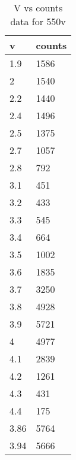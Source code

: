 \begin{table}[H]
    \centering
    \begin{tabular}{|l|l|}
    \hline
        v & counts \\ \hline
        1.9 & 1586 \\ \hline
        2 & 1540 \\ \hline
        2.2 & 1440 \\ \hline
        2.4 & 1496 \\ \hline
        2.5 & 1375 \\ \hline
        2.7 & 1057 \\ \hline
        2.8 & 792 \\ \hline
        3.1 & 451 \\ \hline
        3.2 & 433 \\ \hline
        3.3 & 545 \\ \hline
        3.4 & 664 \\ \hline
        3.5 & 1002 \\ \hline
        3.6 & 1835 \\ \hline
        3.7 & 3250 \\ \hline
        3.8 & 4928 \\ \hline
        3.9 & 5721 \\ \hline
        4 & 4977 \\ \hline
        4.1 & 2839 \\ \hline
        4.2 & 1261 \\ \hline
        4.3 & 431 \\ \hline
        4.4 & 175 \\ \hline
        3.86 & 5764 \\ \hline
        3.94 & 5666 \\ \hline
    \end{tabular}
    \caption{V vs counts data for 550v}
    \label{tab:550}
\end{table}